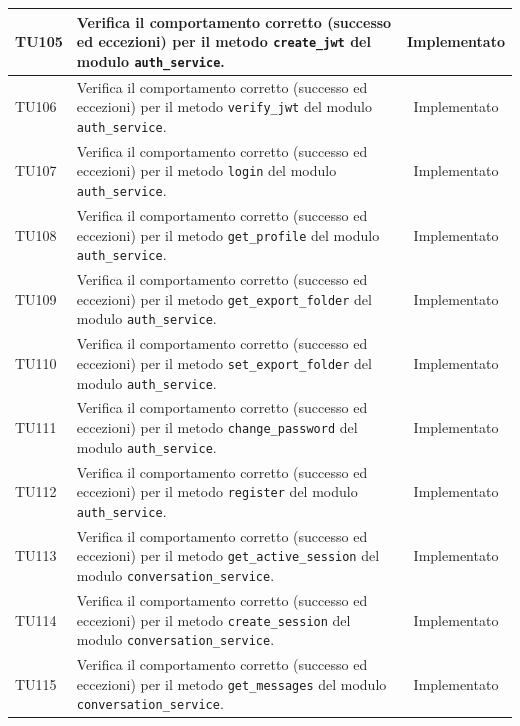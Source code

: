 \documentclass[a4paper,11pt,oneside]{scrartcl}
\begin{document}
\begin{longtable}{|p{1.9cm}|p{11.6cm}|c|}
    TU105           & Verifica il comportamento corretto (successo ed eccezioni) per il metodo \texttt{create\_jwt} del modulo \texttt{auth\_service}.                             & Implementato   \\ \hline
    TU106           & Verifica il comportamento corretto (successo ed eccezioni) per il metodo \texttt{verify\_jwt} del modulo \texttt{auth\_service}.                             & Implementato   \\ \hline
    TU107           & Verifica il comportamento corretto (successo ed eccezioni) per il metodo \texttt{login} del modulo \texttt{auth\_service}.                                   & Implementato   \\ \hline
    TU108           & Verifica il comportamento corretto (successo ed eccezioni) per il metodo \texttt{get\_profile} del modulo \texttt{auth\_service}.                            & Implementato   \\ \hline
    TU109           & Verifica il comportamento corretto (successo ed eccezioni) per il metodo \texttt{get\_export\_folder} del modulo \texttt{auth\_service}.                     & Implementato   \\ \hline
    TU110           & Verifica il comportamento corretto (successo ed eccezioni) per il metodo \texttt{set\_export\_folder} del modulo \texttt{auth\_service}.                     & Implementato   \\ \hline
    TU111           & Verifica il comportamento corretto (successo ed eccezioni) per il metodo \texttt{change\_password} del modulo \texttt{auth\_service}.                        & Implementato   \\ \hline
    TU112           & Verifica il comportamento corretto (successo ed eccezioni) per il metodo \texttt{register} del modulo \texttt{auth\_service}.                                & Implementato   \\ \hline
    TU113           & Verifica il comportamento corretto (successo ed eccezioni) per il metodo \texttt{get\_active\_session} del modulo \texttt{conversation\_service}.            & Implementato   \\ \hline
    TU114           & Verifica il comportamento corretto (successo ed eccezioni) per il metodo \texttt{create\_session} del modulo \texttt{conversation\_service}.                 & Implementato   \\ \hline
    TU115           & Verifica il comportamento corretto (successo ed eccezioni) per il metodo \texttt{get\_messages} del modulo \texttt{conversation\_service}.                   & Implementato   \\ \hline

\end{longtable}
\end{document}
